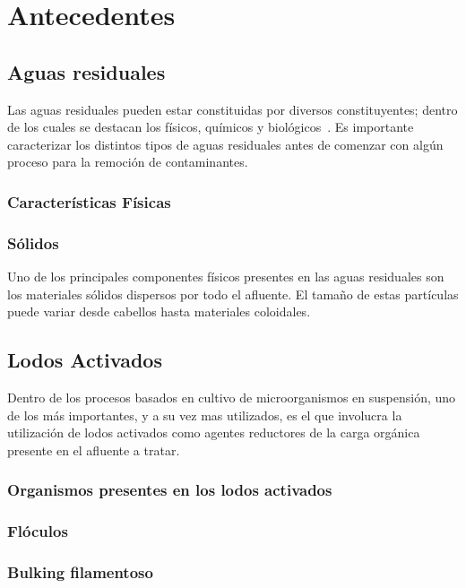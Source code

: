 \section{Antecedentes}
\subsection{Aguas residuales}
Las aguas residuales pueden estar constituidas por diversos constituyentes; dentro de los cuales se destacan los físicos, químicos y biológicos~\citep{crites}. Es importante caracterizar los distintos tipos de aguas residuales antes de comenzar con algún proceso para la remoción de contaminantes.
\subsubsection{Características Físicas}
\subsubsection*{Sólidos}
Uno de los principales componentes físicos presentes en las aguas residuales son los materiales sólidos dispersos por todo el afluente. El tamaño de estas partículas puede variar desde cabellos hasta materiales coloidales. 
\subsection{Lodos Activados}
Dentro de los procesos basados en cultivo de microorganismos en suspensión, uno de los más importantes, y a su vez mas utilizados, es el que involucra la utilización de lodos activados como agentes reductores de la carga orgánica presente en el afluente a tratar.
\subsubsection{Organismos presentes en los lodos activados}
\subsubsection{Flóculos}
\subsubsection{Bulking filamentoso}
